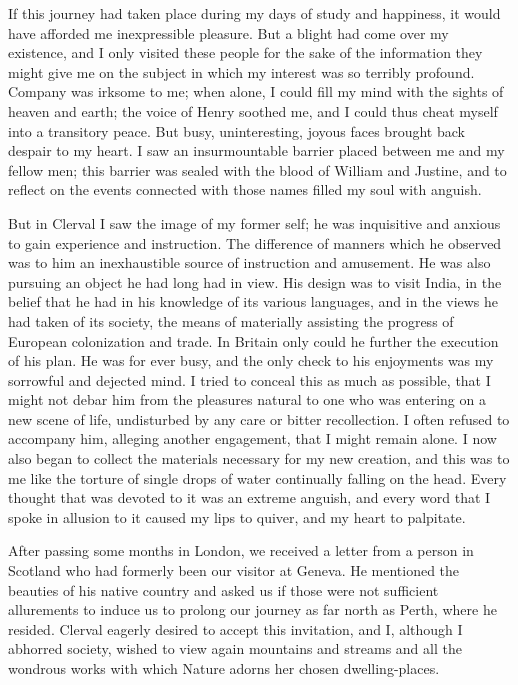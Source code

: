 \documentclass[12pt,openright]{book}
\begin{document}
If this journey had taken place during my days of study and happiness, it would have afforded me inexpressible pleasure. But a blight had come over my existence, and I only visited these people for the sake of the information they might give me on the subject in which my interest was so terribly profound. Company was irksome to me; when alone, I could fill my mind with the sights of heaven and earth; the voice of Henry soothed me, and I could thus cheat myself into a transitory peace. But busy, uninteresting, joyous faces brought back despair to my heart. I saw an insurmountable barrier placed between me and my fellow men; this barrier was sealed with the blood of William and Justine, and to reflect on the events connected with those names filled my soul with anguish.

But in Clerval I saw the image of my former self; he was inquisitive and anxious to gain experience and instruction. The difference of manners which he observed was to him an inexhaustible source of instruction and amusement. He was also pursuing an object he had long had in view. His design was to visit India, in the belief that he had in his knowledge of its various languages, and in the views he had taken of its society, the means of materially assisting the progress of European colonization and trade. In Britain only could he further the execution of his plan. He was for ever busy, and the only check to his enjoyments was my sorrowful and dejected mind. I tried to conceal this as much as possible, that I might not debar him from the pleasures natural to one who was entering on a new scene of life, undisturbed by any care or bitter recollection. I often refused to accompany him, alleging another engagement, that I might remain alone. I now also began to collect the materials necessary for my new creation, and this was to me like the torture of single drops of water continually falling on the head. Every thought that was devoted to it was an extreme anguish, and every word that I spoke in allusion to it caused my lips to quiver, and my heart to palpitate.

After passing some months in London, we received a letter from a person in Scotland who had formerly been our visitor at Geneva. He mentioned the beauties of his native country and asked us if those were not sufficient allurements to induce us to prolong our journey as far north as Perth, where he resided. Clerval eagerly desired to accept this invitation, and I, although I abhorred society, wished to view again mountains and streams and all the wondrous works with which Nature adorns her chosen dwelling-places.
\end{document}
